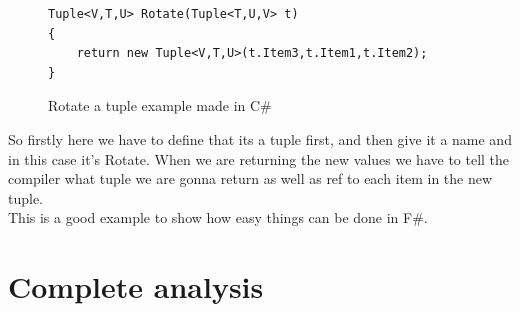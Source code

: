 \documentclass[12pt, a4paper]{article}
\begin{document}
\begin{figure}[!h]
\begin{lstlisting}
Tuple<V,T,U> Rotate(Tuple<T,U,V> t) 
{ 
    return new Tuple<V,T,U>(t.Item3,t.Item1,t.Item2); 
}
\end{lstlisting}
\caption{Rotate a tuple example made in C\#}
\label{fig:RotateTupleCSharp}
\end{figure}

So firstly here we have to define that its a tuple first, and then give it a name and in this case it’s Rotate. When we are returning the new values we have to tell the compiler what tuple we are gonna return as well as ref to each item in the new tuple.\\

This is a good example to show how easy things can be done in F\#.

\newpage
\section{Complete analysis}






\end{document}
